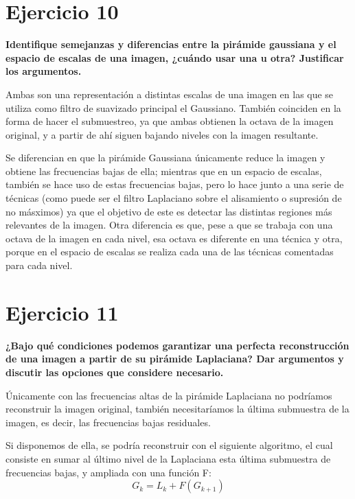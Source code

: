 \documentclass[11pt,a4paper]{article}
\begin{document}
\section*{Ejercicio 10}

\textbf{Identifique semejanzas y diferencias entre la pirámide gaussiana y el espacio de escalas de una imagen, ¿cuándo usar una u
otra? Justificar los argumentos.}

Ambas son una representación a distintas escalas de una imagen en las que se utiliza como filtro de suavizado principal el Gaussiano.
También coinciden en la forma de hacer el submuestreo, ya que ambas obtienen la octava de la imagen original, y a partir de ahí siguen
bajando niveles con la imagen resultante.

Se diferencian en que la pirámide Gaussiana únicamente reduce la imagen y obtiene las frecuencias bajas de ella; mientras que en un
espacio de escalas, también se hace uso de estas frecuencias bajas, pero lo hace junto a una serie de técnicas (como puede ser el filtro
Laplaciano sobre el alisamiento o supresión de no másximos) ya que el objetivo de este es detectar las distintas regiones más relevantes
de la imagen. Otra diferencia es que, pese a que se trabaja con una octava de la imagen en cada nivel, esa octava es diferente en una
técnica y otra, porque en el espacio de escalas se realiza cada una de las técnicas comentadas para cada nivel.


\section*{Ejercicio 11}

\textbf{¿Bajo qué condiciones podemos garantizar una perfecta reconstrucción de una imagen a partir de su pirámide Laplaciana? Dar
argumentos y discutir las opciones que considere necesario.}

Únicamente con las frecuencias altas de la pirámide Laplaciana no podríamos reconstruir la imagen original, también necesitaríamos la 
última submuestra de la imagen, es decir, las frecuencias bajas residuales.

Si disponemos de ella, se podría reconstruir con el siguiente algoritmo, el cual consiste en sumar al último nivel de la Laplaciana
esta última submuestra de frecuencias bajas, y ampliada con una función F:
\begin{equation}
G_k=L_k+F(G_{k+1})
\end{equation}
\end{document}
